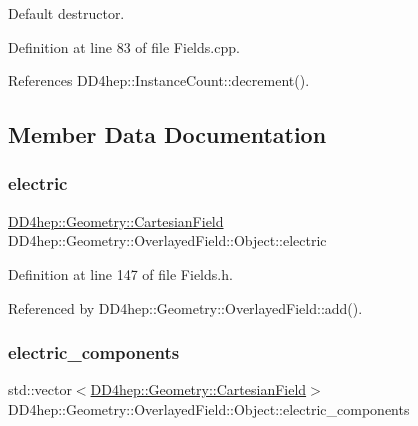 Default destructor. 



Definition at line 83 of file Fields.\+cpp.



References D\+D4hep\+::\+Instance\+Count\+::decrement().



\subsection{Member Data Documentation}
\hypertarget{class_d_d4hep_1_1_geometry_1_1_overlayed_field_1_1_object_a3bdf6ca218ef224725fa0a28e050c1a1}{}\label{class_d_d4hep_1_1_geometry_1_1_overlayed_field_1_1_object_a3bdf6ca218ef224725fa0a28e050c1a1} 
\subsubsection{\texorpdfstring{electric}{electric}}
{\footnotesize\ttfamily \hyperlink{class_d_d4hep_1_1_geometry_1_1_cartesian_field}{D\+D4hep\+::\+Geometry\+::\+Cartesian\+Field} D\+D4hep\+::\+Geometry\+::\+Overlayed\+Field\+::\+Object\+::electric}



Definition at line 147 of file Fields.\+h.



Referenced by D\+D4hep\+::\+Geometry\+::\+Overlayed\+Field\+::add().

\hypertarget{class_d_d4hep_1_1_geometry_1_1_overlayed_field_1_1_object_aae39088c562716b2948e205cebb2c8b4}{}\label{class_d_d4hep_1_1_geometry_1_1_overlayed_field_1_1_object_aae39088c562716b2948e205cebb2c8b4} 
\subsubsection{\texorpdfstring{electric\+\_\+components}{electric\_components}}
{\footnotesize\ttfamily std\+::vector$<$\hyperlink{class_d_d4hep_1_1_geometry_1_1_cartesian_field}{D\+D4hep\+::\+Geometry\+::\+Cartesian\+Field}$>$ D\+D4hep\+::\+Geometry\+::\+Overlayed\+Field\+::\+Object\+::electric\+\_\+components}



